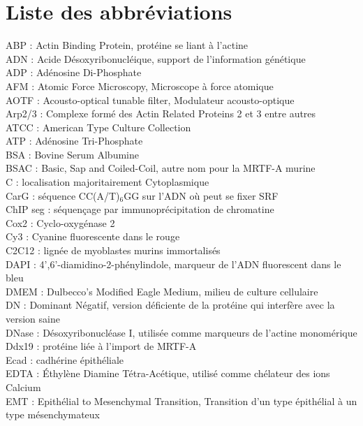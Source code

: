 \chapter*{Liste des abbréviations}

ABP : Actin Binding Protein, protéine se liant à l'actine\\
ADN : Acide Désoxyribonucléique, support de l'information génétique\\
ADP : Adénosine Di-Phosphate\\
AFM : Atomic Force Microscopy, Microscope à force atomique\\
AOTF : Acousto-optical tunable filter, Modulateur acousto-optique\\
Arp2/3 : Complexe formé des Actin Related Proteins 2 et 3 entre autres\\
ATCC : American Type Culture Collection\\
ATP : Adénosine Tri-Phosphate\\
BSA : Bovine Serum Albumine\\
BSAC : Basic, Sap and Coiled-Coil, autre nom pour la MRTF-A murine\\
C : localisation majoritairement Cytoplasmique\\
CarG : séquence CC(A/T)$_6$GG sur l'ADN où peut se fixer SRF\\
ChIP seg : séquençage par immunoprécipitation de chromatine\\
Cox2 : Cyclo-oxygénase 2\\
Cy3 : Cyanine fluorescente dans le rouge\\
C2C12 : lignée de myoblastes murins immortalisés\\
DAPI :  4',6'-diamidino-2-phénylindole, marqueur de l'ADN fluorescent dans le bleu\\
DMEM : Dulbecco's Modified Eagle Medium, milieu de culture cellulaire\\
DN : Dominant Négatif, version déficiente de la protéine qui interfère avec la version saine\\
DNase : Désoxyribonucléase I, utilisée comme marqueurs de l'actine monomérique\\
Ddx19 : protéine liée à l'import de MRTF-A\\
Ecad : cadhérine épithéliale\\
EDTA : Éthylène Diamine Tétra-Acétique, utilisé comme chélateur des ions Calcium\\
EMT : Epithélial to Mesenchymal Transition, Transition d'un type épithélial à un type mésenchymateux\\
